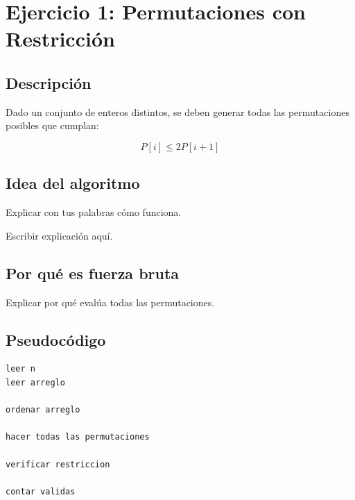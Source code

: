 \documentclass[12pt]{article}
\begin{document}

\section{Ejercicio 1: Permutaciones con Restricción}

\subsection{Descripción}

Dado un conjunto de enteros distintos, se deben generar todas las permutaciones posibles que cumplan:

\begin{equation}
P[i] \leq 2P[i+1]
\end{equation}

\subsection{Idea del algoritmo}

Explicar con tus palabras cómo funciona.

\begin{respuesta}

Escribir explicación aquí.

\end{respuesta}

\subsection{Por qué es fuerza bruta}

\begin{respuesta}

Explicar por qué evalúa todas las permutaciones.

\end{respuesta}

\subsection{Pseudocódigo}

\begin{verbatim}
leer n
leer arreglo

ordenar arreglo

hacer todas las permutaciones

verificar restriccion

contar validas
\end{verbatim}
\end{document}
